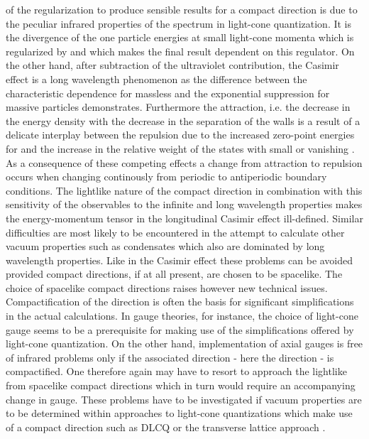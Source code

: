 \documentclass[a4paper,twocolumn,eqsecnum,aps]{revtex4}
\begin{document}
 of the regularization to produce sensible results for a compact \coordHE{} direction is  due to the peculiar infrared properties of the spectrum in light-cone quantization.  It is the divergence of the one particle energies at small light-cone momenta which is regularized by \coordHE{} and which makes the final result dependent on this regulator. On the other hand, after subtraction of the ultra\-violet contribution, the Casimir effect is a long wavelength phenomenon as the difference  between  the characteristic \coordHE{} dependence  for massless and the exponential suppression \coordHE{} for massive particles demonstrates. Furthermore the attraction, i.e. the decrease in the energy density with the decrease in the separation of the walls is a result of  a delicate interplay between the repulsion due to the increased zero-point energies for \coordHE{}  and the increase in the relative weight of the states with small or vanishing \coordHE{}. As a consequence of these compe\-ting effects a change from attraction to repulsion occurs when chan\-ging continously from periodic to antiperiodic boundary conditions. The lightlike nature of the compact direction in combination with this sensitivity of the observables to the infinite and long wavelength properties makes the energy-momentum tensor in the longitudinal Casimir effect ill-defined. Similar difficulties are most likely to be encountered in the attempt to calculate other vacuum properties such as condensates which also are dominated by long wavelength properties.  Like in the Casimir effect these problems can be avoided provided  compact directions, if at all present, are chosen to be spacelike. The choice of  spacelike compact directions raises however  new technical issues.  Compactification of the \coordHE{} direction is often the basis for significant simplifications in the actual calculations. In gauge theories, for instance,  the choice of light-cone gauge \coordHE{} seems to be a prerequisite for making use of the simplifications offered by light-cone quantization. On the other hand, implementation of axial gauges is free of infrared problems only if the associated direction - here the \coordHE{} direction - is compac\-tified. One therefore again may have to resort to approach the lightlike from spacelike compact directions which in turn would require an accompanying change in gauge. These problems have to be investigated  if va\-cuum properties are to be determined within approaches to light-cone quantizations which make use of a compact \coordHE{} direction such as  DLCQ \cite{pauli1,pauli2,pauli3,pauli4} or the transverse lattice approach \cite{bardeen,burkardt,dalley,sande}.   
\end{document}
